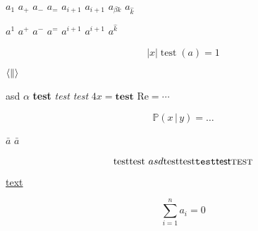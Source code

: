 \documentclass{minimal}
\begin{document}
$a_1$
$a_+$
$a_-$
$a_=$
$a_{i + 1}$
$a_{i+1}$
$a_{\beta k}$
$a_{\hat k}$

$a^1$
$a^+$
$a^-$
$a^=$
$a^{i + 1}$
$a^{i+1}$
$a^{\hat k}$

\begin{equation}
  \bigl\lvert x \bigr\rvert
  \operatorname{test}(a) = 1
\end{equation}

$\langle \| \\ \rangle$

\textup{asd $\alpha$}
\textbf{test}
\textit{test}
\textsl{test}
$4 \mathit{x} = \mathbf{test}$
$\mathrm{Re} = \cdots$

\begin{equation}
  \mathbb{P}(x \,|\, y) \!= \dots
\end{equation}

$\bar a$
$\bar{a}$

\begin{equation}
  \text{test}
  \textnormal{test $asd$}
  \textrm{test}
  \textup{test}
  \texttt{test}
  \textsf{test}
  \textsc{test}
\end{equation}

\href{url}{text}


\begin{equation}
  \sum_{i=1}^n a_i = 0
\end{equation}
\end{document}
